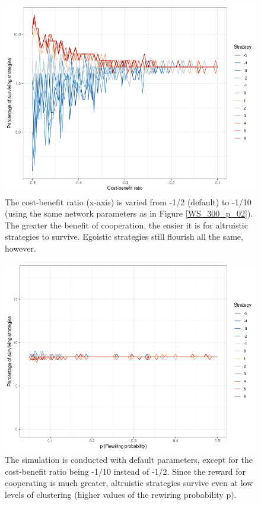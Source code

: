 \documentclass{JASSS}
\begin{document}
\begin{figure}
	\centering
	\includegraphics[width=\linewidth]{./figures/results_WS_N300_truthful_new_vary_cb.png}
	\caption{The cost-benefit ratio (x-axis) is varied from -1/2 (default) to -1/10 (using the same network parameters as in Figure \ref{WS_300_p_02}). The greater the benefit of cooperation, the easier it is for altruistic strategies to survive. Egoistic strategies still flourish all the same, however.}
	\label{vary_cb}
\end{figure}
\begin{figure}
	\centering
	\includegraphics[width=\linewidth]{./figures/results_WS_N300_truthful_new_vary_p_cb_1_10.png}
	\caption{The simulation is conducted with default parameters, except for the cost-benefit ratio being -1/10 instead of -1/2. Since the reward for cooperating is much greater, altruistic strategies survive even at low levels of clustering (higher values of the rewiring probability p).}
	\label{cb1_10_vary_p}
\end{figure}
\end{document}
